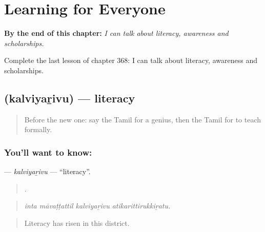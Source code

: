 
\chapter{Learning for Everyone}
\label{ch:ta-learning-for-everyone}

\begin{chapteropening}
\textbf{By the end of this chapter:} \emph{I can talk about literacy, awareness and scholarships.}

Complete the last lesson of chapter 368: I can talk about literacy, awareness and scholarships.
\end{chapteropening}

\section[\texorpdfstring{\ta{கல்வியறிவு} (kalviyaṟivu)}{கல்வியறிவு (kalviyaṟivu)}]{ (kalviyaṟivu) — literacy}

\label{lesson:TA-C368-kalviyarivu}



\begin{quote}
Before the new one: say the Tamil for a genius, then the Tamil for to teach formally.
\end{quote}

\subsection*{You'll want to know: }
\textbf{} — \emph{kalviyaṟivu} — \textquotedblleft{}literacy\textquotedblright{}.

\begin{quote}
   .
\end{quote}

\begin{quote}
\emph{inta māvaṭṭattil kalviyaṟivu atikarittirukkiṟatu.}
\end{quote}

\begin{quote}
Literacy has risen in this district.
\end{quote}

